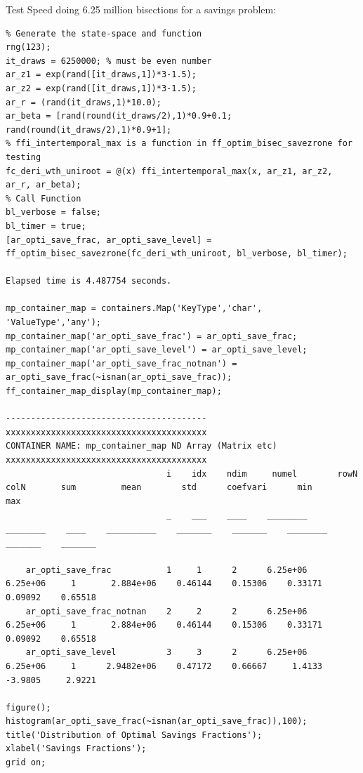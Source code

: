 \documentclass[
]{book}
\begin{document}
Test Speed doing 6.25 million bisections for a savings problem:

\begin{verbatim}
% Generate the state-space and function
rng(123);
it_draws = 6250000; % must be even number
ar_z1 = exp(rand([it_draws,1])*3-1.5);
ar_z2 = exp(rand([it_draws,1])*3-1.5);
ar_r = (rand(it_draws,1)*10.0);
ar_beta = [rand(round(it_draws/2),1)*0.9+0.1; rand(round(it_draws/2),1)*0.9+1]; 
% ffi_intertemporal_max is a function in ff_optim_bisec_savezrone for testing
fc_deri_wth_uniroot = @(x) ffi_intertemporal_max(x, ar_z1, ar_z2, ar_r, ar_beta);
% Call Function
bl_verbose = false;
bl_timer = true;
[ar_opti_save_frac, ar_opti_save_level] = ff_optim_bisec_savezrone(fc_deri_wth_uniroot, bl_verbose, bl_timer);

Elapsed time is 4.487754 seconds.

mp_container_map = containers.Map('KeyType','char', 'ValueType','any');
mp_container_map('ar_opti_save_frac') = ar_opti_save_frac;
mp_container_map('ar_opti_save_level') = ar_opti_save_level;
mp_container_map('ar_opti_save_frac_notnan') = ar_opti_save_frac(~isnan(ar_opti_save_frac));
ff_container_map_display(mp_container_map);

----------------------------------------
xxxxxxxxxxxxxxxxxxxxxxxxxxxxxxxxxxxxxxxx
CONTAINER NAME: mp_container_map ND Array (Matrix etc)
xxxxxxxxxxxxxxxxxxxxxxxxxxxxxxxxxxxxxxxx
                                i    idx    ndim     numel        rowN      colN       sum         mean        std      coefvari      min        max  
                                _    ___    ____    ________    ________    ____    __________    _______    _______    ________    _______    _______

    ar_opti_save_frac           1     1      2      6.25e+06    6.25e+06     1       2.884e+06    0.46144    0.15306    0.33171     0.09092    0.65518
    ar_opti_save_frac_notnan    2     2      2      6.25e+06    6.25e+06     1       2.884e+06    0.46144    0.15306    0.33171     0.09092    0.65518
    ar_opti_save_level          3     3      2      6.25e+06    6.25e+06     1      2.9482e+06    0.47172    0.66667     1.4133     -3.9805     2.9221

figure();
histogram(ar_opti_save_frac(~isnan(ar_opti_save_frac)),100);
title('Distribution of Optimal Savings Fractions');
xlabel('Savings Fractions');
grid on;
\end{verbatim}
\end{document}
